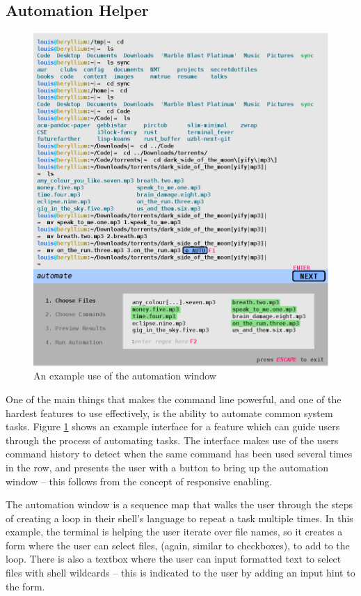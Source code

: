 \subsection{Automation Helper}

\begin{figure}[H]
  \centering
  \includegraphics[width=0.8\linewidth]{figures/interface/automation.eps}
  \caption{An example use of the automation window}
  \label{fig:autow}
\end{figure}

One of the main things that makes the command line powerful, and one of the
hardest features to use effectively, is the ability to automate common system
tasks. Figure \ref{fig:autow} shows an example interface for a feature which can
guide users through the process of automating tasks. The interface makes use of
the users command history to detect when the same command has been used several
times in the row, and presents the user with a button to bring up the automation
window \--- this follows from the concept of responsive enabling.

The automation window is a sequence map that walks the user through the steps of
creating a loop in their shell's language to repeat a task multiple times. In
this example, the terminal is helping the user iterate over file names, so it
creates a form where the user can select files, (again, similar to checkboxes),
to add to the loop. There is also a textbox where the user can input formatted
text to select files with shell wildcards \--- this is indicated to the user by
adding an input hint to the form.

